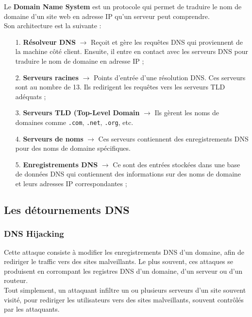 \documentclass[12pt,a4paper]{article}
\begin{document}
	Le \textbf{Domain Name System} est un protocole qui permet de traduire le nom de domaine d'un site web en adresse IP qu'un serveur peut comprendre. \\
	
	Son architecture est la suivante : \\
	\begin{itemize}
		\item[1.] \textbf{Résolveur DNS} $\rightarrow$ Reçoit et gère les requêtes DNS qui proviennent de la machine côté client. Ensuite, il entre en contact avec les serveurs DNS pour traduire le nom de domaine en adresse IP ;
		\item[2.] \textbf{Serveurs racines} $\rightarrow$ Points d'entrée d'une résolution DNS. Ces serveurs sont au nombre de 13. Ils redirigent les requêtes vers les serveurs TLD adéquats ;
		\item[3.] \textbf{Serveurs TLD (Top-Level Domain} $\rightarrow$ Ils gèrent les noms de domaines comme \texttt{.com}, \texttt{.net}, \texttt{.org}, etc.
		\item[4.] \textbf{Serveurs de noms} $\rightarrow$ Ces serveurs contiennent des enregistrements DNS pour des noms de domaine spécifiques. 
		\item[5.] \textbf{Enregistrements DNS} $\rightarrow$ Ce sont des entrées stockées dans une base de données DNS qui contiennent des informations sur des noms de domaine et leurs adresses IP correspondantes ;
		
	\end{itemize}
	
	\subsection{Les détournements DNS}
	
	
		\subsubsection{DNS Hijacking}
		
		Cette attaque consiste à modifier les enregistrements DNS d'un domaine, afin de rediriger le traffic vers des sites malveillants. Le plus souvent, ces attaques se produisent en corrompant les registres DNS d'un domaine, d'un serveur ou d'un routeur. \\
		
		Tout simplement, un attaquant infiltre un ou plusieurs serveurs d'un site souvent visité, pour rediriger les utilisateurs vers des sites malveillants, souvent contrôlés par les attaquants.
		
\end{document}
